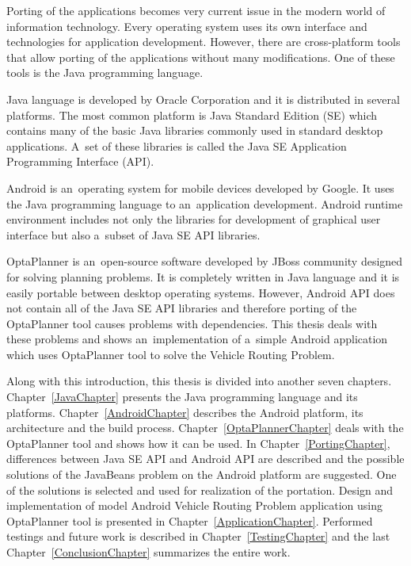 Porting of the applications becomes very current issue in the modern world of information technology. Every operating
system uses its own interface and technologies for application development. However, there are cross-platform tools that
allow porting of the applications without many modifications. One of these tools is the Java programming language.

Java language is developed by Oracle Corporation and it is distributed in several platforms. The most common platform is
Java Standard Edition (SE) which contains many of the basic Java libraries commonly used in standard desktop
applications. A~set of these libraries is called the Java SE Application Programming Interface (API).

Android is an~operating system for mobile devices developed by Google. It uses the Java programming language to
an~application development. Android runtime environment includes not only the libraries for development of graphical
user interface but also a~subset of Java SE API libraries.

OptaPlanner is an~open-source software developed by JBoss community designed for solving planning problems. It is
completely written in Java language and it is easily portable between desktop operating systems. However, Android API
does not contain all of the Java SE API libraries and therefore porting of the OptaPlanner tool causes problems with
dependencies. This thesis deals with these problems and shows an~implementation of a~simple Android application which
uses OptaPlanner tool to solve the Vehicle Routing Problem.

Along with this introduction, this thesis is divided into another seven chapters. Chapter~\ref{JavaChapter} presents the
Java programming language and its platforms. Chapter~\ref{AndroidChapter} describes the Android platform, its
architecture and the build process. Chapter~\ref{OptaPlannerChapter} deals with the OptaPlanner tool and shows how it
can be used. In Chapter~\ref{PortingChapter}, differences between Java SE API and Android API are described and the
possible solutions of the JavaBeans problem on the Android platform are suggested. One of the solutions is selected and
used for realization of the portation. Design and implementation of model Android Vehicle Routing Problem application
using OptaPlanner tool is presented in Chapter~\ref{ApplicationChapter}. Performed testings and future work is
described in Chapter~\ref{TestingChapter} and the last Chapter~\ref{ConclusionChapter} summarizes the entire work.
